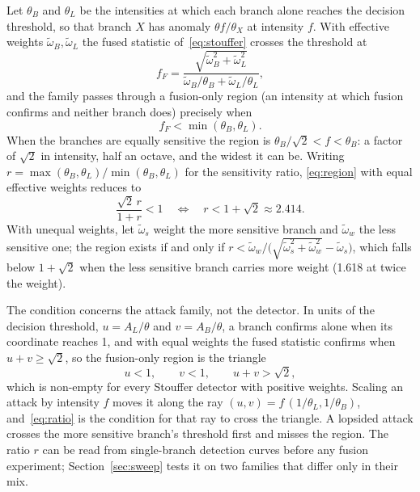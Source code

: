 \documentclass[pdflatex,sn-mathphys-num]{sn-jnl}%
\theoremstyle{thmstyleone}%
\theoremstyle{thmstyletwo}%
\theoremstyle{thmstylethree}%
\begin{document}
Let $\theta_B$ and $\theta_L$ be the intensities at which each branch alone
reaches the decision threshold, so that branch $X$ has anomaly
$\theta f/\theta_X$ at intensity $f$. With effective weights
$\tilde\omega_B, \tilde\omega_L$ the fused statistic of~\eqref{eq:stouffer}
crosses the threshold at
\begin{equation}
\label{eq:ffused}
f_F = \frac{\sqrt{\tilde\omega_B^{2} + \tilde\omega_L^{2}}}
           {\tilde\omega_B/\theta_B + \tilde\omega_L/\theta_L},
\end{equation}
and the family passes through a fusion-only region (an intensity at which
fusion confirms and neither branch does) precisely when
\begin{equation}
\label{eq:region}
f_F < \min(\theta_B, \theta_L).
\end{equation}
When the branches are equally sensitive the region is
$\theta_B/\sqrt2 < f < \theta_B$: a factor of $\sqrt2$ in intensity, half an
octave, and the widest it can be. Writing
$r = \max(\theta_B,\theta_L)/\min(\theta_B,\theta_L)$ for the sensitivity
ratio, \eqref{eq:region} with equal effective weights reduces to
\begin{equation}
\label{eq:ratio}
\frac{\sqrt{2}\,r}{1+r} < 1
\quad\Longleftrightarrow\quad
r < 1 + \sqrt{2} \approx 2.414 .
\end{equation}
With unequal weights, let $\tilde\omega_s$ weight the more sensitive branch and
$\tilde\omega_w$ the less sensitive one; the region exists if and only if
$r < \tilde\omega_w / \bigl(\sqrt{\tilde\omega_s^2 + \tilde\omega_w^2} -
\tilde\omega_s\bigr)$, which falls below $1+\sqrt{2}$ when the less sensitive
branch carries more weight (1.618 at twice the weight).

The condition concerns the attack family, not the detector. In units of the
decision threshold, $u = A_L/\theta$ and $v = A_B/\theta$, a branch confirms
alone when its coordinate reaches 1, and with equal weights the fused
statistic confirms when $u + v \ge \sqrt2$, so the fusion-only region is the
triangle
\begin{equation}
\label{eq:wedge}
u < 1, \qquad v < 1, \qquad u + v > \sqrt2,
\end{equation}
which is non-empty for every Stouffer detector with positive weights. Scaling
an attack by intensity $f$ moves it along the ray
$(u, v) = f\,(1/\theta_L, 1/\theta_B)$, and~\eqref{eq:ratio} is the condition
for that ray to cross the triangle. A lopsided attack crosses the more
sensitive branch's threshold first and misses the region. The ratio $r$ can be
read from single-branch detection curves before any fusion experiment;
Section~\ref{sec:sweep} tests it on two families that differ only in their
mix.
\end{document}
